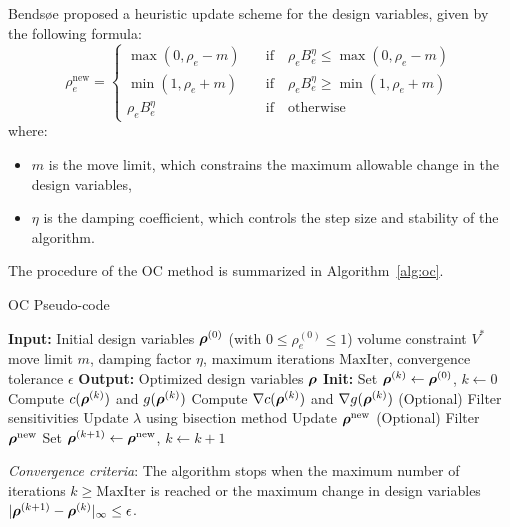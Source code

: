 \documentclass[mathpazo]{cicp}
\begin{document}
Bendsøe \cite{bendsoe1995optimization} proposed a heuristic update scheme for the design variables, given by the following formula:
\begin{equation*}
	\rho_e^{\mathrm{new}}=
	\begin{cases}
		\max(0,\rho_e-m)\quad&\text{if}\quad \rho_eB_e^\eta\leq\max(0,\rho_e-m)\\
		\min(1,\rho_e+m)\quad&\text{if}\quad\rho_eB_e^\eta \geq \min(1,\rho_e+m)\\
		\rho_eB_e^\eta\quad&\text{if}\quad\text{otherwise}
	\end{cases}
\end{equation*}
where: 
\begin{itemize} 
	\item $m$ is the move limit, which constrains the maximum allowable change in the design variables,
	\item $\eta$ is the damping coefficient, which controls the step size and stability of the algorithm. 
\end{itemize}

The procedure of the OC method is summarized in Algorithm~\ref{alg:oc}.
\begin{FloatAlgo}{OC Pseudo-code}\label{alg:oc}
	\begin{algorithmic}[1]
		\STATE \textbf{Input:} 
		\STATE Initial design variables $\boldsymbol{\rho}^{(0)}$ (with $0 \leq \rho_e^{(0)} \leq 1$)
		\STATE volume constraint $V^*$
		\STATE move limit $m$, damping factor $\eta$, maximum iterations $\mathrm{MaxIter}$, convergence tolerance $\epsilon$
		\STATE \textbf{Output:} Optimized design variables $\boldsymbol{\rho}$
		\STATE \textbf{Init:} Set $\boldsymbol{\rho}^{(k)} \leftarrow \boldsymbol{\rho}^{(0)}$, $k \leftarrow 0$
		\STATE Compute $c(\boldsymbol{\rho}^{(k)})$ and $g(\boldsymbol{\rho}^{(k)})$
		\STATE Compute $\nabla c(\boldsymbol{\rho}^{(k)})$ and $\nabla g(\boldsymbol{\rho}^{(k)})$
		\STATE (Optional) Filter sensitivities
		\STATE Update $\lambda$ using bisection method
		\STATE Update $\boldsymbol{\rho}^{\text{new}}$
		\STATE (Optional) Filter $\boldsymbol{\rho}^{\text{new}}$
		\STATE Set $\boldsymbol{\rho}^{(k+1)} \leftarrow \boldsymbol{\rho}^{\text{new}}$, $k \leftarrow k + 1$
		\ENDWHILE
	\end{algorithmic}
	\smallskip
	\textit{Convergence criteria}: The algorithm stops when the maximum number of iterations $k \geq \text{MaxIter}$ is reached or the maximum change in design variables $|\boldsymbol{\rho}^{(k+1)} - \boldsymbol{\rho}^{(k)}|_\infty \leq \epsilon$.
\end{FloatAlgo}
\end{document}

